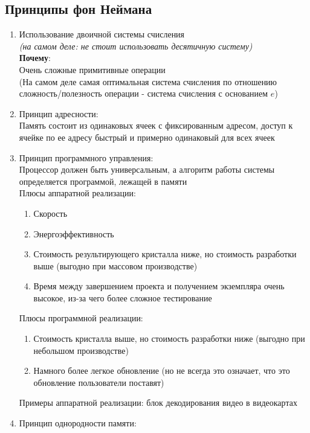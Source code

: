 \documentclass[12pt]{article}
\begin{document}
\subsection{Принципы фон Неймана}
\begin{enumerate}
    \item Использование двоичной системы счисления\\
    \textit{(на самом деле: не стоит использовать десятичную систему)}\\
    \textbf{Почему}:\\
    Очень сложные примитивные операции\\
    (На самом деле самая оптимальная система счисления по отношению сложность/полезность операции - система счисления с основанием $e$)
    \item Принцип адресности:\\
    Память состоит из одинаковых ячеек с фиксированным адресом, доступ к ячейке по ее адресу быстрый и примерно одинаковый для всех ячеек
    \item Принцип программного управления:\\
    Процессор должен быть универсальным, а алгоритм работы системы определяется программой, лежащей в памяти\\
    Плюсы аппаратной реализации:
    \begin{enumerate}
        \item Скорость
        \item Энергоэффективность
        \item Стоимость результирующего кристалла ниже, но стоимость разработки выше (выгодно при массовом производстве)
        \item Время между завершением проекта и получением экземпляра очень высокое, из-за чего более сложное тестирование
    \end{enumerate}
    Плюсы программной реализации:
    \begin{enumerate}
        \item Стоимость кристалла выше, но стоимость разработки ниже (выгодно при небольшом производстве)
        \item Намного более легкое обновление (но не всегда это означает, что это обновление пользователи поставят)
    \end{enumerate}
    Примеры аппаратной реализации: блок декодирования видео в видеокартах\\
    \item Принцип однородности памяти:\\

\end{enumerate}
\end{document}
